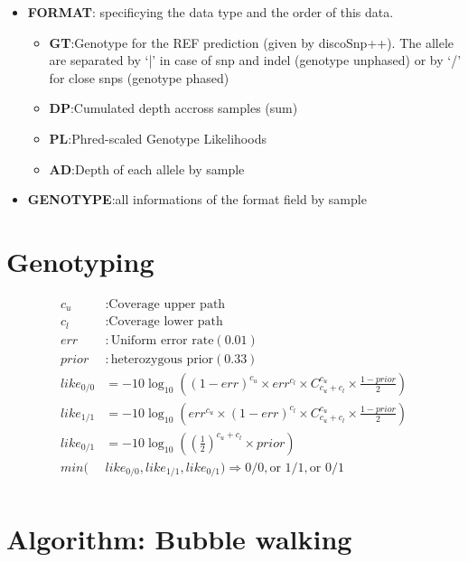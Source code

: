\documentclass{bmcart}
\begin{document}
\begin{itemize}
\begin{itemize}
	\end{itemize}
			
	\item \textbf{FORMAT}: specificying the data type and the order of this data.
		\begin{itemize}
			\item \textbf{GT}:Genotype for the REF prediction (given by discoSnp++). The allele are separated by `|' in case of snp and indel (genotype unphased) or by `/' for close snps (genotype phased)
			\item \textbf{DP}:Cumulated depth accross samples (sum)
			\item \textbf{PL}:Phred-scaled Genotype Likelihoods
			\item \textbf{AD}:Depth of each allele by sample
		\end{itemize}
	\item \textbf{GENOTYPE}:all informations of the format field by sample
\end{itemize}

\section{Genotyping} %
\begin{align*}
       c_u &: \text{Coverage upper path} \\
       c_l &: \text{Coverage lower path}\\
       err &: \text{Uniform error rate} (0.01) \\
       prior &: \text{heterozygous prior} (0.33)\\
       like_{0/0}&=-10\log_{10}\left((1-err)^{c_u}\times err^{c_l}\times C_{c_u+c_l}^{c_u} \times \frac{1-prior}{2}\right)\\
       like_{1/1}&=-10\log_{10}\left(err^{c_u}\times (1-err)^{c_l}\times C_{c_u+c_l}^{c_u} \times \frac{1-prior}{2}\right)\\
       like_{0/1}&=-10\log_{10}\left(\left(\frac{1}{2}\right)^{c_u+c_l}\times prior\right)\\
       min(&like_{0/0},like_{1/1},like_{0/1}) \Rightarrow 0/0, \text{or } 1/1, \text{or } 0/1\\
\end{align*}

\section{Algorithm: Bubble walking}
\end{document}
